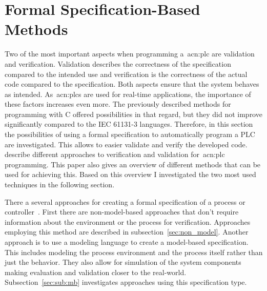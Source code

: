 \chapter{Formal Specification-Based Methods}
\label{sec:formal_methods}

Two of the most important aspects when programming a~\acrshort{acn:plc} are validation and verification.
Validation describes the correctness of the specification compared to the intended use and verification is the correctness of the actual code compared to the specification.
Both aspects ensure that the system behaves as intended.
As~\glspl{acn:plc} are used for real-time applications, the importance of these factors increases even more.
The previously described methods for programming with C offered possibilities in that regard, but they did not improve significantly compared to the IEC 61131-3 languages.
Therefore, in this section the possibilities of using a formal specification to automatically program a PLC are investigated.
This allows to easier validate and verify the developed code.
\citeauthor{Frey:2000aa}~\cite{Frey:2000aa} describe different approaches to verification and validation for~\acrshort{acn:plc} programming.
This paper also gives an overview of different methods that can be used for achieving this.
Based on this overview I investigated the two most used techniques in the following section.

There a several approaches for creating a formal specification of a process or controller~\cite{Frey:2000aa}.
First there are non-model-based approaches that don't require information about the environment or the process for verification.
Approaches employing this method are described in subsection~\ref{sec:non_model}.
Another approach is to use a modeling language to create a model-based specification.
This includes modeling the process environment and the process itself rather than just the behavior.
They also allow for simulation of the system components making evaluation and validation closer to the real-world.
Subsection~\ref{sec:sub:mb} investigates approaches using this specification type.

